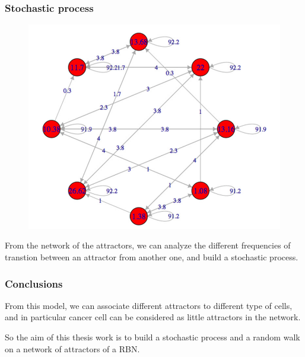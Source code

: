\documentclass{beamer}
\begin{document}
\begin{frame}
\frametitle{Stochastic process}
\begin{figure}
\centering
\includegraphics[scale=0.2]{matrix.png}

\end{figure}
From the network of the attractors, we can analyze the different frequencies of transtion between an attractor from another one, and build a stochastic process.
\end{frame}



\begin{frame}
\frametitle{Conclusions}
From this model, we can associate different attractors to different type of cells, and in particular cancer cell can be considered as little attractors in the network.


So the aim of this thesis work is to build a stochastic process and a random walk on a network of attractors of a RBN.



\end{frame}
\end{document}
